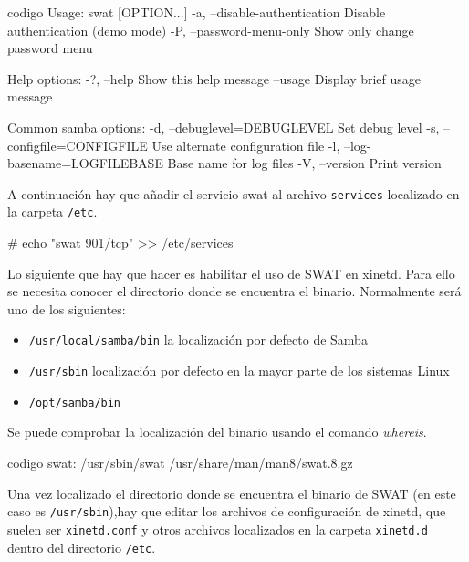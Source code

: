 \begin{SaveVerbatim}{codigo}
 Usage: swat [OPTION...]
  -a, --disable-authentication       Disable authentication (demo mode)
  -P, --password-menu-only           Show only change password menu

Help options:
  -?, --help                         Show this help message
  --usage                            Display brief usage message

Common samba options:
  -d, --debuglevel=DEBUGLEVEL        Set debug level
  -s, --configfile=CONFIGFILE        Use alternate configuration file
  -l, --log-basename=LOGFILEBASE     Base name for log files
  -V, --version                      Print version
\end{SaveVerbatim}

A continuación hay que añadir el servicio swat al archivo \texttt{services} localizado en la carpeta \texttt{/etc}.

\begin{listing}[style=consola, numbers=none]
 # echo "swat	901/tcp" >> /etc/services
\end{listing}

Lo siguiente que hay que hacer es habilitar el uso de SWAT en xinetd. Para ello se necesita conocer el directorio donde se encuentra el binario. Normalmente será uno de los siguientes:
\begin{itemize}
 \item \texttt{/usr/local/samba/bin} la localización por defecto de Samba
 \item \texttt{/usr/sbin} localización por defecto en la mayor parte de los sistemas Linux
\item \texttt{/opt/samba/bin}
\end{itemize}

Se puede comprobar la localización del binario usando el comando \emph{whereis}.


\begin{SaveVerbatim}{codigo}
swat: /usr/sbin/swat /usr/share/man/man8/swat.8.gz
\end{SaveVerbatim}

Una vez localizado el directorio donde se encuentra el binario de SWAT (en este caso es \texttt{/usr/sbin}),hay que editar los archivos de configuración de xinetd, que suelen ser \texttt{xinetd.conf} y otros archivos localizados en la carpeta \texttt{xinetd.d} dentro del directorio \texttt{/etc}.

